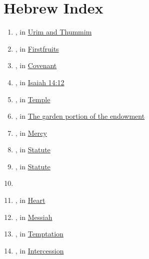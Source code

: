 \section{Hebrew Index}
	\label{HEBREWINDEX}
	
	\begin{enumerate}
	
		\item \hyperref[URIM]{}, in \hyperref[URIMTHUMMIM]{Urim and Thummim}
	
		\item \hyperref[BIKKURIM]{}, in \hyperref[FIRSTFRUITS]{Firstfruits}
		
		\item \hyperref[BERIT]{}, in \hyperref[COVENANT]{Covenant}
		
		\item \hyperref[HELEL]{}, in \hyperref[ISAIAH-14-12]{Isaiah 14:12}
		
		\item \hyperref[HAR]{}, in \hyperref[TEMPLE]{Temple}
		
		\item \hyperref[CHAGORAH]{}, in \hyperref[TEMPLE-ENDOWMENT-ENDOW-PRE-1990-GARDEN]{The garden portion of the endowment}
		
		\item \hyperref[CHESED]{}, in \hyperref[MERCY]{Mercy}
		
		\item \hyperref[CHOQ]{}, in \hyperref[STATUTE]{Statute}
		
		\item \hyperref[CHUQQAH]{}, in \hyperref[STATUTE]{Statute}
		
		\item \hyperref[YATED]{}
		
		\item \hyperref[LEB]{}, in \hyperref[HEART]{Heart}
		
		\item \hyperref[MASHIACH]{}, in \hyperref[MESSIAH]{Messiah}
		
		\item \hyperref[NASAH]{}, in \hyperref[TEMPTATION]{Temptation}
		
		\item \hyperref[PAGA]{}, in \hyperref[INTERCESSION]{Intercession}
		

\end{enumerate}
